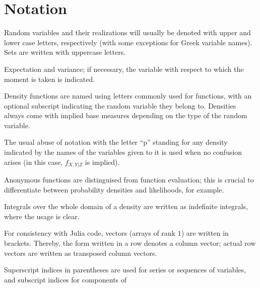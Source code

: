 \chapter*{Notation}
\label{cha:notation}

\begin{description}[style=nextline, leftmargin=4cm]
\item[\(\Prob{\Theta \in A \given X = x}\)] Random variables and their realizations will usually be
  denoted with upper and lower case letters, respectively
  (with some exceptions for Greek variable names).  Sets
  are written with uppercase letters.
\item[{\(\Exp{X}, \Var[X]{f(X, Y)}\)}] Expectation and variance; if necessary, the variable with
  respect to which the moment is taken is indicated.
\item[\(\phi(x), f_{Z}(x)\)] Density functions are named using letters commonly used for functions,
  with an optional subscript indicating the random variable they belong to.  Densities always come
  with implied base measures depending on the type of the random variable.
\item[\(\prob{x, y \given z}\)] The usual abuse of notation with the letter \enquote{p} standing for
  any density indicated by the names of the variables given to it is used when no confusion arises
  (in this case, \(f_{X,Y|Z}\) is implied).
\item[{\(y \mapsto \prob{x \given y, z}\)}] Anonymous functions are distinguised from function
  evaluation; this is crucial to differentiate between probability densities and likelihoods, for
  example.
\item[\(\int \prob{x} \dif x = 1\)] Integrals over the whole domain of a density are written as
  indefinite integrals, where the usage is clear.
\item[{\([x, y, z] = \smash[b]{\begin{bsmallmatrix}x\\y\\z\end{bsmallmatrix}}\)}] For consistency
  with Julia code, vectors (arrays of rank \(1\)) are written in brackets.  Thereby, the form
  written in a row denotes a column vector; actual row vectors are written as transposed column
  vectors.
\item[{\(\kth{\Theta} = [\kth{\Theta}_1, \ldots, \kth{\Theta}_N]\)}] Superscript indices in
  parentheses are used for series or sequences of variables, and subscript indices for components of

\end{description}
